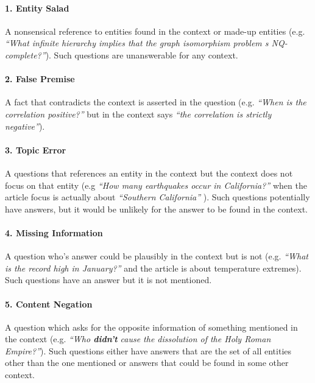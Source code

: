 \documentclass[11pt,a4paper]{article}
\begin{document}
    \paragraph{1. Entity Salad} A nonsensical reference to entities found in the context or made-up entities (e.g. {\it ``What infinite hierarchy implies that the graph isomorphism problem s NQ-complete?''}). Such questions are unanswerable for any context.
    \vspace{-7pt}
    \paragraph{2. False Premise} A fact that contradicts the context is asserted in the question (e.g. {\it ``When is the correlation positive?''} but in the context says {\it ``the correlation is strictly negative''}). 
    \vspace{-7pt}
    \paragraph{3. Topic Error} A questions that references an entity in the context but the context does not focus on that entity (e.g {\it ``How many earthquakes occur in California?''} when the article focus is actually about {\it ``Southern California''} ). Such questions potentially have answers, but it would be unlikely for the answer to be found in the context. 
    \vspace{-7pt}
    \paragraph{4. Missing Information} A question who's answer could be plausibly in the context but is not (e.g. {\it ``What is the record high in January?''} and the article is about temperature extremes). Such questions have an answer but it is not mentioned. 
    \vspace{-7pt}
    \paragraph{5. Content Negation} A question which asks for the opposite information of something mentioned in the context (e.g.  {\it ``Who {\bf didn’t} cause the dissolution of the Holy Roman Empire?''}). Such questions either have answers that are the set of all entities other than the one mentioned or answers that could be found in some other context.
\end{document}
